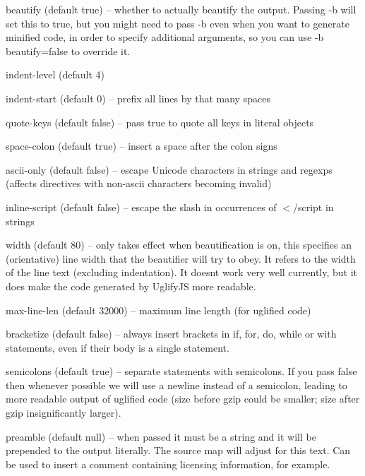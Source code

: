 \begin{DoxyItemize}
\item {\ttfamily beautify} (default {\ttfamily true}) -- whether to actually beautify the output. Passing {\ttfamily -\/b} will set this to true, but you might need to pass {\ttfamily -\/b} even when you want to generate minified code, in order to specify additional arguments, so you can use {\ttfamily -\/b beautify=false} to override it.
\item {\ttfamily indent-\/level} (default 4)
\item {\ttfamily indent-\/start} (default 0) -- prefix all lines by that many spaces
\item {\ttfamily quote-\/keys} (default {\ttfamily false}) -- pass {\ttfamily true} to quote all keys in literal objects
\item {\ttfamily space-\/colon} (default {\ttfamily true}) -- insert a space after the colon signs
\item {\ttfamily ascii-\/only} (default {\ttfamily false}) -- escape Unicode characters in strings and regexps (affects directives with non-\/ascii characters becoming invalid)
\item {\ttfamily inline-\/script} (default {\ttfamily false}) -- escape the slash in occurrences of {\ttfamily $<$/script} in strings
\item {\ttfamily width} (default 80) -- only takes effect when beautification is on, this specifies an (orientative) line width that the beautifier will try to obey. It refers to the width of the line text (excluding indentation). It doesn\textquotesingle{}t work very well currently, but it does make the code generated by Uglify\+JS more readable.
\item {\ttfamily max-\/line-\/len} (default 32000) -- maximum line length (for uglified code)
\item {\ttfamily bracketize} (default {\ttfamily false}) -- always insert brackets in {\ttfamily if}, {\ttfamily for}, {\ttfamily do}, {\ttfamily while} or {\ttfamily with} statements, even if their body is a single statement.
\item {\ttfamily semicolons} (default {\ttfamily true}) -- separate statements with semicolons. If you pass {\ttfamily false} then whenever possible we will use a newline instead of a semicolon, leading to more readable output of uglified code (size before gzip could be smaller; size after gzip insignificantly larger).
\item {\ttfamily preamble} (default {\ttfamily null}) -- when passed it must be a string and it will be prepended to the output literally. The source map will adjust for this text. Can be used to insert a comment containing licensing information, for example.

\end{DoxyItemize}

